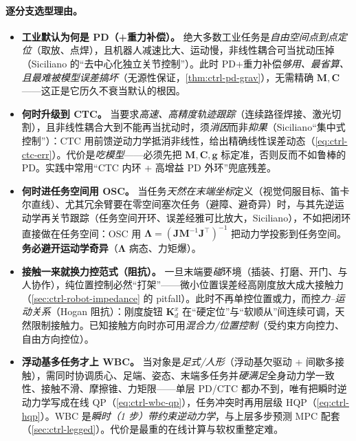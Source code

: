 \paragraph{逐分支选型理由。}
\begin{itemize}
  \item \textbf{工业默认为何是 PD（+重力补偿）。} 绝大多数工业任务是\emph{自由空间点到点定位}（取放、点焊），且机器人减速比大、运动慢，非线性耦合可当扰动压掉（Siciliano 的“去中心化独立关节控制”\cite{spong2006robot}）。此时 PD+重力补偿\emph{够用、最省算、且最难被模型误差搞坏}（无源性保证，\cref{thm:ctrl-pd-grav}），无需精确 $\mathbf{M},\mathbf{C}$——这正是它历久不衰当默认的根因。
  \item \textbf{何时升级到 CTC。} 当要求\emph{高速、高精度轨迹跟踪}（连续路径焊接、激光切割），且非线性耦合大到不能再当扰动时，须\emph{消因}而非\emph{抑果}（Siciliano“集中式控制”\cite{spong2006robot}）：CTC 用前馈逆动力学抵消非线性，给出精确线性误差动态（\cref{eq:ctrl-ctc-err}）。代价是\emph{吃模型}——必须先把 $\mathbf{M},\mathbf{C},\mathbf{g}$ 标定准，否则反而不如鲁棒的 PD。实践中常用“CTC 内环 + 高增益 PD 外环”兜底残差。
  \item \textbf{何时进任务空间用 OSC。} 当任务\emph{天然在末端坐标}定义（视觉伺服目标、笛卡尔直线）、尤其冗余臂要在零空间塞次任务（避障、避奇异）时，与其先逆运动学再关节跟踪（任务空间开环、误差经雅可比放大，Siciliano），不如把闭环直接做在任务空间：OSC 用 $\boldsymbol{\Lambda}=(\mathbf{J}\mathbf{M}^{-1}\mathbf{J}^\top)^{-1}$ 把动力学投影到任务空间。\textbf{务必避开运动学奇异}（$\boldsymbol{\Lambda}$ 病态、力矩爆）。
  \item \textbf{接触一来就换力控范式（阻抗）。} 一旦末端要\emph{碰}环境（插装、打磨、开门、与人协作），纯位置控制必然“打架”——微小位置误差经高刚度放大成大接触力（\cref{sec:ctrl-robot-impedance} 的 pitfall）。此时不再单控位置或力，而控\emph{力--运动关系}（Hogan 阻抗\cite{spong2006robot}）：刚度旋钮 $\mathbf{K}_d^x$ 在“硬定位”与“软顺从”间连续可调，天然限制接触力。已知接触方向时亦可用\emph{混合力/位置控制}（受约束方向控力、自由方向控位）。
  \item \textbf{浮动基多任务才上 WBC。} 当对象是\emph{足式/人形}（浮动基欠驱动 + 间歇多接触），需同时协调质心、足端、姿态、末端多任务并\emph{硬满足}全身动力学一致性、接触不滑、摩擦锥、力矩限——单层 PD/CTC 都办不到，唯有把瞬时逆动力学写成在线 QP（\cref{eq:ctrl-wbc-qp}），任务冲突时再用层级 HQP（\cref{eq:ctrl-hqp}）。WBC 是\emph{瞬时（1 步）带约束逆动力学}，与上层多步预测 MPC 配套（\cref{sec:ctrl-legged}）。代价是最重的在线计算与软权重整定难。
\end{itemize}


